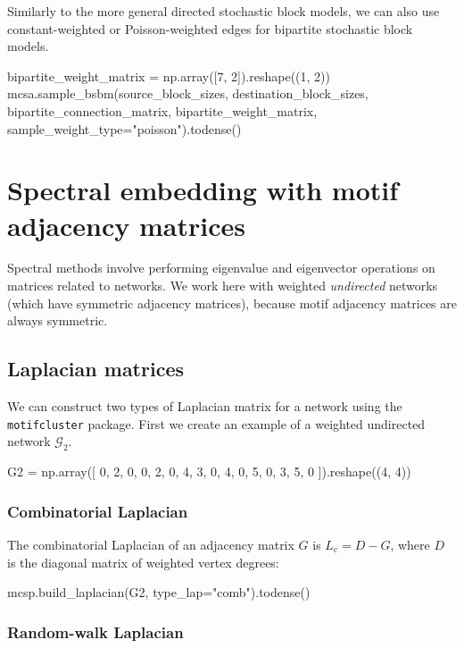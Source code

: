 \documentclass{article}
\begin{document}
Similarly to the more general directed stochastic block models,
we can also use constant-weighted or Poisson-weighted edges for bipartite
stochastic block models.

\begin{pyconsole}
bipartite_weight_matrix = np.array([7, 2]).reshape((1, 2))
mcsa.sample_bsbm(source_block_sizes, destination_block_sizes,
  bipartite_connection_matrix, bipartite_weight_matrix,
  sample_weight_type="poisson").todense()
\end{pyconsole}




\section{Spectral embedding with motif adjacency matrices}

Spectral methods involve performing eigenvalue and
eigenvector operations on matrices related to networks.
We work here with weighted \emph{undirected} networks
(which have symmetric adjacency matrices),
because motif adjacency matrices are always symmetric.

\subsection{Laplacian matrices}

We can construct two types of Laplacian matrix for a network
using the \texttt{motifcluster} package.
First we create an example of a weighted undirected network $\mathcal{G}_2$.

\begin{pyconsole}
G2 = np.array([
  0, 2, 0, 0,
  2, 0, 4, 3,
  0, 4, 0, 5,
  0, 3, 5, 0
]).reshape((4, 4))
\end{pyconsole}

\subsubsection{Combinatorial Laplacian}

The combinatorial Laplacian of an adjacency matrix $G$ is
$L_\mathrm{c} = D - G$,
where $D$ is the diagonal matrix of weighted vertex degrees:

\begin{pyconsole}
mcsp.build_laplacian(G2, type_lap="comb").todense()
\end{pyconsole}

\subsubsection{Random-walk Laplacian}
\end{document}
